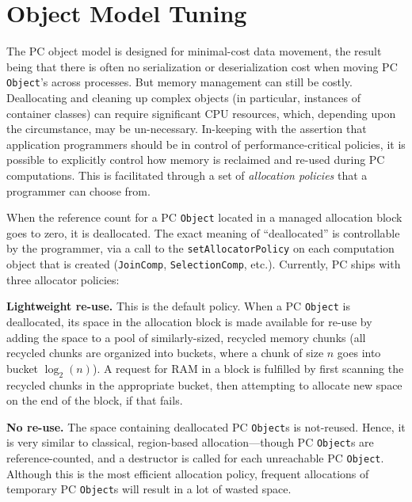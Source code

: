\section{Object Model Tuning}
\label{sec:allocation}

\noindent
The PC object model is designed for minimal-cost data movement, the result being that there is often no serialization or deserialization
cost
when moving PC \texttt{Object}'s across processes.  But memory management can still be costly.  Deallocating and cleaning
up complex objects (in particular, instances of container classes) can require significant CPU resources, which, depending upon the 
circumstance, may be un-necessary.  In-keeping with the assertion that application programmers should be in
control of performance-critical policies, it is possible to explicitly control how memory is reclaimed and re-used during PC computations.
This is facilitated through a set of \emph{allocation policies} that a programmer can choose from.

When the reference count for a PC \texttt{Object} located in a managed allocation block goes to zero, it is deallocated.  The exact
meaning of ``deallocated'' is controllable by the programmer, via a call to the \texttt{setAllocatorPolicy} on each computation object
that is created (\texttt{JoinComp}, \texttt{SelectionComp}, etc.).  Currently, PC ships with
three allocator policies:

\vspace{5pt}
\noindent
\textbf{Lightweight re-use.}  This is the default policy.  When a PC \texttt{Object} is deallocated, its space in the allocation block is made available for re-use by
adding the space to a pool of similarly-sized, recycled memory chunks (all recycled chunks are organized into buckets, where a chunk of size
$n$ goes into bucket $\log_2 (n)$).  A request for RAM in a block is fulfilled by first scanning the recycled chunks in the appropriate bucket, then
attempting to allocate new space on the end of the block, if that fails.

\vspace{5pt}
\noindent
\textbf{No re-use.}  The space containing deallocated PC \texttt{Object}s is not-reused.  Hence, it is very similar to classical, region-based allocation---though PC \texttt{Object}s
are reference-counted, and a destructor is called for each unreachable PC \texttt{Object}.
Although this is the most efficient allocation policy, frequent allocations of temporary PC \texttt{Object}s will result in a lot of wasted space.

